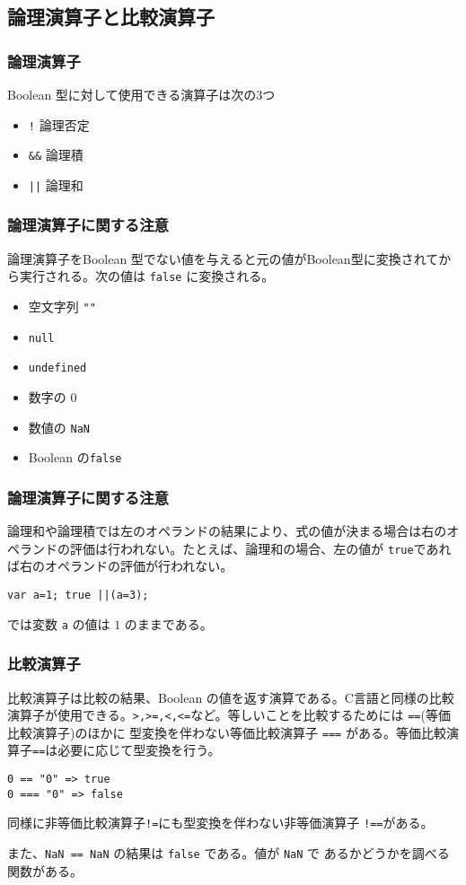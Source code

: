 \subsection{論理演算子と比較演算子}
\begin{frame}[containsverbatim]
 \frametitle{論理演算子}
Boolean 型に対して使用できる演算子は次の3つ
\begin{itemize}
 \item \Verb+!+ 論理否定
 \item \Verb+&&+ 論理積
 \item \Verb+||+ 論理和
\end{itemize}
\end{frame}
\begin{frame}[containsverbatim]
 \frametitle{論理演算子に関する注意}
論理演算子をBoolean 型でない値を与えると元の値がBoolean型に変換されてか
ら実行される。次の値は \Verb+false+ に変換される。
\begin{itemize}
 \item 空文字列 \Verb+""+
 \item \Verb+null+
 \item \Verb+undefined+
 \item 数字の $0$
 \item 数値の \Verb+NaN+
 \item Boolean の\Verb+false+
\end{itemize}
\end{frame}
\begin{frame}[containsverbatim]
 \frametitle{論理演算子に関する注意}
論理和や論理積では左のオペランドの結果により、式の値が決まる場合は右のオ
ペランドの評価は行われない。たとえば、論理和の場合、左の値が
\Verb+true+であれば右のオペランドの評価が行われない。
\begin{Verbatim}
var a=1; true ||(a=3); 
\end{Verbatim}
では変数 \Verb+a+ の値は $1$ のままである。
\end{frame}
\begin{frame}[containsverbatim]
 \frametitle{比較演算子}
比較演算子は比較の結果、Boolean の値を返す演算である。C言語と同様の比較
演算子が使用できる。\texttt{>,>=,<,<=}など。等しいことを比較するためには
\Verb+==+(等価比較演算子)のほかに 型変換を伴わない等価比較演算子
\Verb+===+ がある。等価比較演算子\texttt{==}は必要に応じて型変換を行う。
\begin{Verbatim}
0 == "0" => true
0 === "0" => false
\end{Verbatim}
同様に非等価比較演算子\texttt{!=}にも型変換を伴わない非等価演算子
\texttt{!==}がある。

 また、\Verb+NaN == NaN+ の結果は \Verb+false+ である。値が \Verb+NaN+ で
あるかどうかを調べる関数がある。
\end{frame}
